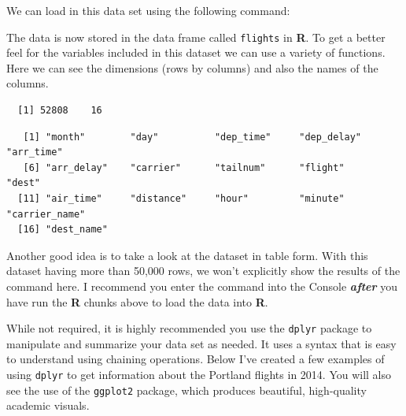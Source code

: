\documentclass[12pt,phd,a4paper,twoside]{ucl_thesis}
\begin{document}
  We can load in this data set using the following command:
  \begin{Shaded}
  \begin{Highlighting}[]
  \StringTok{ }\NormalTok{(}\NormalTok{)}
  \end{Highlighting}
  \end{Shaded}
  The data is now stored in the data frame called \texttt{flights} in \textbf{R}. To get a better feel for the variables included in this dataset we can use a variety of functions. Here we can see the dimensions (rows by columns) and also the names of the columns.
  \begin{Shaded}
  \begin{Highlighting}[]
  \end{Highlighting}
  \end{Shaded}
  \begin{verbatim}
  [1] 52808    16
  \end{verbatim}
  \begin{Shaded}
  \begin{Highlighting}[]
  \end{Highlighting}
  \end{Shaded}
  \begin{verbatim}
   [1] "month"        "day"          "dep_time"     "dep_delay"    "arr_time"    
   [6] "arr_delay"    "carrier"      "tailnum"      "flight"       "dest"        
  [11] "air_time"     "distance"     "hour"         "minute"       "carrier_name"
  [16] "dest_name"   
  \end{verbatim}
  Another good idea is to take a look at the dataset in table form. With this dataset having more than 50,000 rows, we won't explicitly show the results of the command here. I recommend you enter the command into the Console \textbf{\emph{after}} you have run the \textbf{R} chunks above to load the data into \textbf{R}.
  \begin{Shaded}
  \begin{Highlighting}[]
  \end{Highlighting}
  \end{Shaded}
  While not required, it is highly recommended you use the \texttt{dplyr} package to manipulate and summarize your data set as needed. It uses a syntax that is easy to understand using chaining operations. Below I've created a few examples of using \texttt{dplyr} to get information about the Portland flights in 2014. You will also see the use of the \texttt{ggplot2} package, which produces beautiful, high-quality academic visuals.
  
\end{document}
